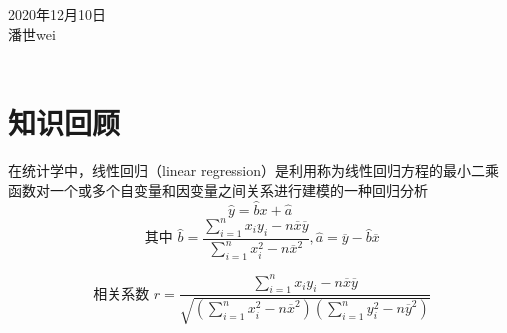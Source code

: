 \documentclass[UTF8]{article}
\begin{document}
   
\begin{center}
{}
\\ \hspace*{\fill} \\ 2020年12月10日 
\\潘世wei\\\
\end{center}
\section{知识回顾}  
在统计学中，线性回归（linear regression）是利用称为线性回归方程的最小二乘函数对一个或多个自变量和因变量之间关系进行建模的一种回归分析\\
$$\hat { y } = \hat { b } x + \hat { a }$$ 
$$\text { 其中 }\hat { b } = \frac { \sum\limits _ { i = 1 } ^ { n } x _ { i } y _ { i } - n \overline { x } \overline { y } } { \sum \limits_ { i = 1 } ^ { n } x _ { i } ^ { 2 } - n \overline { x } ^ { 2 } } , \hat { a } = \overline { y } - \hat { b } \overline { x }$$

$$\text { 相关系数 }r = \frac { \sum \limits_ { i = 1 } ^ { n } x _ { i } y _ { i } - n \overline { x } \overline { y } } { \sqrt { ( \sum \limits_ { i = 1 } ^ { n } x _ { i } ^ { 2 } - n \overline { x } ^ { 2 } ) ( \sum \limits_ { i = 1 } ^ { n } y _ { i } ^ { 2 } - n \overline { y } ^ { 2 } ) } } $$
\\
\end{document}
